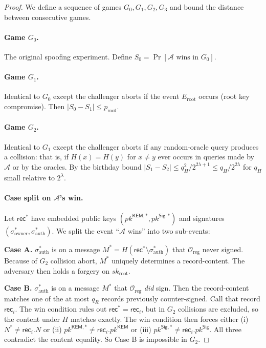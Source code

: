 \documentclass[11pt,a4paper]{article}
\theoremstyle{definition}
\theoremstyle{remark}
\newcommand{\rec}{\mathsf{rec}}
\newcommand{\KEM}{\mathsf{KEM}}
\newcommand{\Sig}{\mathsf{Sig}}
\newcommand{\pk}{\mathit{pk}}
\newcommand{\sk}{\mathit{sk}}
\begin{document}
\begin{proof}
We define a sequence of games $G_0, G_1, G_2, G_3$ and bound the
distance between consecutive games.

\paragraph{Game $G_0$.} The original spoofing experiment. Define $S_0
= \Pr[\mathcal{A} \text{ wins in } G_0]$.

\paragraph{Game $G_1$.} Identical to $G_0$ except the challenger
aborts if the event $E_{\mathrm{root}}$ occurs (root key compromise).
Then $|S_0 - S_1| \le p_{\mathrm{root}}$.

\paragraph{Game $G_2$.} Identical to $G_1$ except the challenger
aborts if any random-oracle query produces a collision: that is, if
$H(x) = H(y)$ for $x \ne y$ ever occurs in queries made by
$\mathcal{A}$ or by the oracles. By the birthday bound $|S_1 - S_2|
\le q_H^2 / 2^{2\lambda+1} \le q_H / 2^{2\lambda}$ for $q_H$ small
relative to $2^\lambda$.

\paragraph{Case split on $\mathcal{A}$'s win.} Let $\rec^*$ have
embedded public keys $(\pk^{\KEM,*}, \pk^{\Sig,*})$ and signatures
$(\sigma^*_{\mathrm{owner}}, \sigma^*_{\mathrm{auth}})$. We split the
event ``$\mathcal{A}$ wins'' into two sub-events:

\textbf{Case A.} $\sigma^*_{\mathrm{auth}}$ is on a message
$M^* = H(\rec^* \setminus \sigma^*_{\mathrm{auth}})$ that
$\mathcal{O}_{\mathrm{reg}}$ never signed. Because of $G_2$ collision
abort, $M^*$ uniquely determines a record-content. The adversary then
holds a forgery on $\sk_{\mathrm{root}}$.

\textbf{Case B.} $\sigma^*_{\mathrm{auth}}$ is on a message
$M^*$ that $\mathcal{O}_{\mathrm{reg}}$ \emph{did} sign. Then the
record-content matches one of the at most $q_R$ records previously
counter-signed. Call that record $\rec_i$. The win condition rules
out $\rec^* = \rec_i$, but in $G_2$ collisions are excluded, so the
content under $H$ matches exactly. The win condition then forces
either (i) $N^* \ne \rec_i.N$ or (ii) $\pk^{\KEM,*} \ne \rec_i.\pk^\KEM$
or (iii) $\pk^{\Sig,*} \ne \rec_i.\pk^\Sig$. All three contradict the
content equality. So Case B is impossible in $G_2$.


\end{proof}
\end{document}
